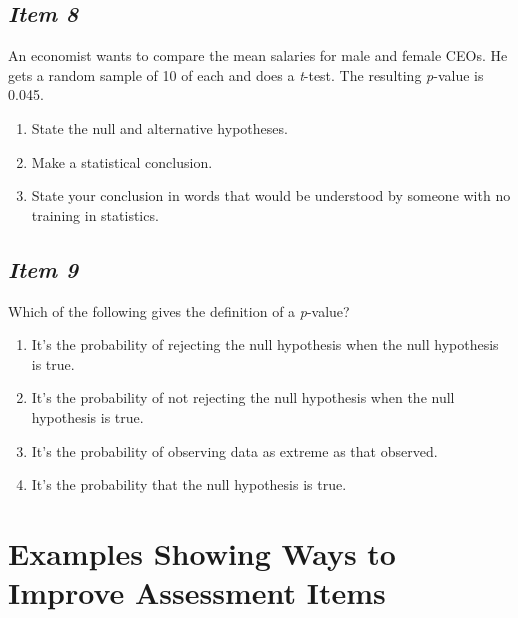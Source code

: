  

\subsection{\textbf{\textit{Item 8}}}
An economist wants to compare  the mean salaries for male and female CEOs. He gets a random sample of 10 of each and does a \textit{t}-test. The resulting \textit{p}-value is 0.045.
\begin{enumerate} [leftmargin=1cm, itemsep=.2em]

\item State the null and alternative hypotheses.
\item Make a statistical conclusion.
\item State your conclusion in words that would be understood by someone with no training in statistics.
\end{enumerate}



\subsection{\textbf{\textit{Item 9}}}
Which of the following gives the definition of a \textit{p}-value?
\renewcommand{\labelenumi}{\Alph{enumi}.}
\begin{enumerate} [leftmargin=1cm, itemsep=.2em]
\item It's the probability of rejecting the null hypothesis when the null hypothesis is true.
\item It's the probability of not rejecting the null hypothesis when the null hypothesis is true.
\item It's the probability of observing data as extreme as that observed.
\item It's the probability that the null hypothesis is true.
\end{enumerate}



\section{\textbf{Examples Showing Ways to Improve Assessment Items}}
